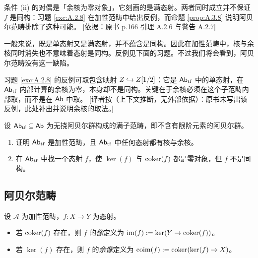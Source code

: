\begin{yizhu}
条件 (ii) 的对偶是「余核为零对象」，它刻画的是满态射。两者同时成立并不保证 $f$ 是同构：习题 \ref{exc:A.2.8} 在加性范畴中给出反例，而命题 \ref{prop:A.3.8} 说明阿贝尔范畴排除了这种可能。
[依据：原书 p.166 引理 A.2.6 与警告 A.2.7]
\end{yizhu}

\begin{warning}\label{warn:A.2.7}
一般来说，既是单态射又是满态射，并不蕴含是同构。因此在加性范畴中，核与余核同时消失也不意味着态射是同构。反例见下面的习题。不过我们将会看到，阿贝尔范畴没有这一缺陷。
\end{warning}

\begin{yizhu}
习题 \ref{exc:A.2.8} 的反例可取包含映射 $Z\hookrightarrow Z[1/2]$：它是 $\mathsf{Ab}_{\mathrm{tf}}$ 中的单态射，在 $\mathsf{Ab}_{\mathrm{tf}}$ 内部计算的余核为零，本身却不是同构。关键在于余核必须在这个子范畴内部取，而不是在 $\mathsf{Ab}$ 中取。
[译者按（上下文推断，无外部依据）：原书未写出该反例，此处补出并说明余核的取法。]
\end{yizhu}

\begin{exercise}\label{exc:A.2.8}
设 $\mathsf{Ab}_{\mathrm{tf}}\subseteq\mathsf{Ab}$ 为无挠阿贝尔群构成的满子范畴，即不含有限阶元素的阿贝尔群。
\begin{enumerate}[label=(\arabic*),leftmargin=2em,itemsep=0.25ex]
  \item 证明 $\mathsf{Ab}_{\mathrm{tf}}$ 是加性范畴，且 $\mathsf{Ab}_{\mathrm{tf}}$ 中任何态射都有核与余核。
  \item 在 $\mathsf{Ab}_{\mathrm{tf}}$ 中找一个态射 $f$，使 $\ker(f)$ 与 $\operatorname{coker}(f)$ 都是零对象，但 $f$ 不是同构。
\end{enumerate}
\end{exercise}

\subsection{阿贝尔范畴}\label{sec:A.3}

\begin{definition}\label{def:A.3.1}
设 $\mathcal{A}$ 为加性范畴，$f:X\to Y$ 为态射。
\begin{itemize}[leftmargin=2em,itemsep=0.25ex]
  \item 若 $\operatorname{coker}(f)$ 存在，则 $f$ 的\emph{像}定义为 $\operatorname{im}(f):=\ker(Y\to\operatorname{coker}(f))$。
  \item 若 $\ker(f)$ 存在，则 $f$ 的\emph{余像}定义为 $\operatorname{coim}(f):=\operatorname{coker}(\ker(f)\to X)$。
\end{itemize}
\end{definition}

